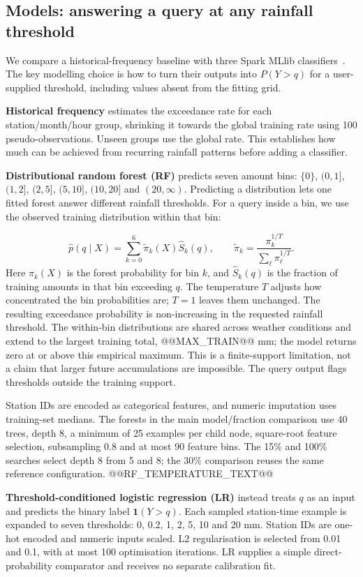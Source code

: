 \subsection{Models: answering a query at any rainfall threshold}
We compare a historical-frequency baseline with three Spark MLlib classifiers~\cite{sparkml}. The key modelling choice is how to turn their outputs into $P(Y>q)$ for a user-supplied threshold, including values absent from the fitting grid.

\textbf{Historical frequency} estimates the exceedance rate for each station/month/hour group, shrinking it towards the global training rate using 100 pseudo-observations. Unseen groups use the global rate. This establishes how much can be achieved from recurring rainfall patterns before adding a classifier.

\textbf{Distributional random forest (RF)} predicts seven amount bins: $\{0\}$, $(0,1]$, $(1,2]$, $(2,5]$, $(5,10]$, $(10,20]$ and $(20,\infty)$. Predicting a distribution lets one fitted forest answer different rainfall thresholds. For a query inside a bin, we use the observed training distribution within that bin:

\[
\widehat p(q\mid X)=\sum_{k=0}^{6}\widetilde\pi_k(X)\widehat S_k(q),
\qquad
\widetilde\pi_k=\frac{\pi_k^{1/T}}{\sum_\ell\pi_\ell^{1/T}}.
\]
Here $\pi_k(X)$ is the forest probability for bin $k$, and $\widehat S_k(q)$ is the fraction of training amounts in that bin exceeding $q$. The temperature $T$ adjusts how concentrated the bin probabilities are; $T=1$ leaves them unchanged. The resulting exceedance probability is non-increasing in the requested rainfall threshold. The within-bin distributions are shared across weather conditions and extend to the largest training total, @@MAX_TRAIN@@ mm; the model returns zero at or above this empirical maximum. This is a finite-support limitation, not a claim that larger future accumulations are impossible. The query output flags thresholds outside the training support.

Station IDs are encoded as categorical features, and numeric imputation uses training-set medians. The forests in the main model/fraction comparison use 40 trees, depth 8, a minimum of 25 examples per child node, square-root feature selection, subsampling 0.8 and at most 90 feature bins. The 15\% and 100\% searches select depth 8 from 5 and 8; the 30\% comparison reuses the same reference configuration. @@RF_TEMPERATURE_TEXT@@

\textbf{Threshold-conditioned logistic regression (LR)} instead treats $q$ as an input and predicts the binary label $\mathbf1(Y>q)$. Each sampled station-time example is expanded to seven thresholds: 0, 0.2, 1, 2, 5, 10 and 20 mm. Station IDs are one-hot encoded and numeric inputs scaled. L2 regularisation is selected from 0.01 and 0.1, with at most 100 optimisation iterations. LR supplies a simple direct-probability comparator and receives no separate calibration fit.

